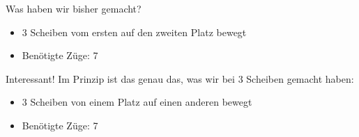 \begin{frame}{Was haben wir bisher gemacht?}
    \begin{itemize}
        \item 3 Scheiben vom ersten auf den zweiten Platz bewegt
        \item Benötigte Züge: 7
    \end{itemize}
    \begin{alertblock}{Interessant!}
    Im Prinzip ist das genau das, was wir bei 3 Scheiben gemacht haben:
    \begin{itemize}
        \item 3 Scheiben von einem Platz auf einen anderen bewegt
        \item Benötigte Züge: 7
    \end{itemize}
    \end{alertblock}
\end{frame}